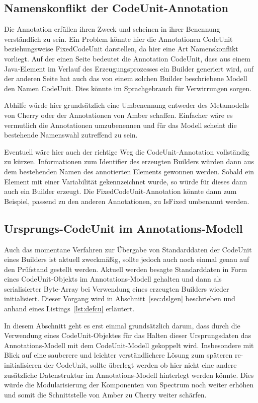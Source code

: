 \documentclass[12pt,oneside,a4paper,parskip]{scrbook}
\begin{document}
\subsection{Namenskonflikt der CodeUnit-Annotation}

Die Annotation erfüllen ihren Zweck und scheinen in ihrer Benennung verständlich zu sein. Ein Problem könnte hier die Annotationen CodeUnit beziehungsweise FixedCodeUnit darstellen, da hier eine Art Namenskonflikt vorliegt. Auf der einen Seite bedeutet die Annotation CodeUnit, dass aus einem Java-Element im Verlauf des Erzeugungsprozesses ein Builder generiert wird, auf der anderen Seite hat auch das von einem solchen Builder beschriebene Modell den Namen CodeUnit. Dies könnte im Sprachgebrauch für Verwirrungen sorgen.

Abhilfe würde hier grundsätzlich eine Umbenennung entweder des Metamodells von Cherry oder der Annotationen von Amber schaffen. Einfacher wäre es vermutlich die Annotationen umzubenennen und für das Modell scheint die bestehende Namenswahl zutreffend zu sein.

Eventuell wäre hier auch der richtige Weg die CodeUnit-Annotation vollständig zu kürzen. Informationen zum Identifier des erzeugten Builders würden dann aus dem bestehenden Namen des annotierten Elements gewonnen werden. Sobald ein Element mit einer Variabilität gekennzeichnet wurde, so würde für dieses dann auch ein Builder erzeugt. Die FixedCodeUnit-Annotation könnte dann zum Beispiel, passend zu den anderen Annotationen, zu IsFixed umbenannt werden.

\subsection{Ursprungs-CodeUnit im Annotations-Modell}

Auch das momentane Verfahren zur Übergabe von Standarddaten der CodeUnit eines Builders ist aktuell zweckmäßig, sollte jedoch auch noch einmal genau auf den Prüfstand gestellt werden. Aktuell werden besagte Standarddaten in Form eines CodeUnit-Objekts im Annotations-Modell gehalten und dann als serialisierter Byte-Array bei Verwendung eines erzeugten Builders wieder initialisiert. Dieser Vorgang wird in Abschnitt~\ref{sec:dslgen} beschrieben und anhand eines Listings~\ref{lst:defcu} erläutert.

In diesem Abschnitt geht es erst einmal grundsätzlich darum, dass durch die Verwendung eines CodeUnit-Objektes für das Halten dieser Ursprungsdaten das Annotations-Modell mit dem CodeUnit-Modell gekoppelt wird. Insbesondere mit Blick auf eine sauberere und leichter verständlichere Lösung zum späteren re-initialisieren der CodeUnit, sollte überlegt werden ob hier nicht eine andere zusätzliche Datenstruktur im Annotations-Modell hinterlegt werden könnte. Dies würde die Modularisierung der Komponenten von Spectrum noch weiter erhöhen und somit die Schnittstelle von Amber zu Cherry weiter schärfen.
\end{document}
